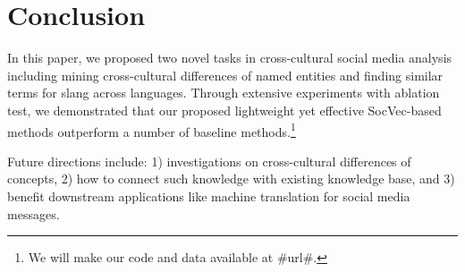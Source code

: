\vspace{-5pt}
\section{Conclusion}
\vspace{-5pt}
In this paper, we proposed two novel tasks in cross-cultural social media analysis including mining cross-cultural differences of named entities and finding similar terms for slang across languages.
Through extensive experiments with ablation  test, we demonstrated that our proposed lightweight yet effective SocVec-based methods outperform a number of baseline methods.\footnote{We will make our code and data available at \#url\#.}

Future directions include: 1) investigations on cross-cultural differences of concepts, 2) how to connect such knowledge with existing knowledge base, and 3) benefit downstream applications like machine translation for social media messages.

%
